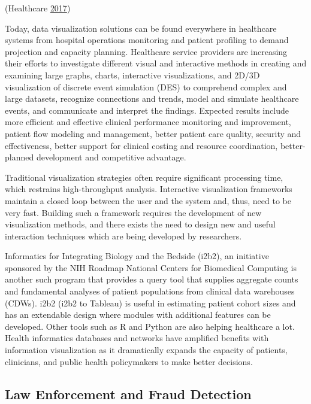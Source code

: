 \documentclass[]{book}
\theoremstyle{definition}
\theoremstyle{definition}
\theoremstyle{definition}
\theoremstyle{remark}
\begin{document}
(Healthcare \protect\hyperlink{ref-marksman}{2017})

Today, data visualization solutions can be found everywhere in
healthcare systems from hospital operations monitoring and patient
profiling to demand projection and capacity planning. Healthcare service
providers are increasing their efforts to investigate different visual
and interactive methods in creating and examining large graphs, charts,
interactive visualizations, and 2D/3D visualization of discrete event
simulation (DES) to comprehend complex and large datasets, recognize
connections and trends, model and simulate healthcare events, and
communicate and interpret the findings. Expected results include more
efficient and effective clinical performance monitoring and improvement,
patient flow modeling and management, better patient care quality,
security and effectiveness, better support for clinical costing and
resource coordination, better-planned development and competitive
advantage.

Traditional visualization strategies often require significant
processing time, which restrains high-throughput analysis. Interactive
visualization frameworks maintain a closed loop between the user and the
system and, thus, need to be very fast. Building such a framework
requires the development of new visualization methods, and there exists
the need to design new and useful interaction techniques which are being
developed by researchers.

Informatics for Integrating Biology and the Bedside (i2b2), an
initiative sponsored by the NIH Roadmap National Centers for Biomedical
Computing is another such program that provides a query tool that
supplies aggregate counts and fundamental analyses of patient
populations from clinical data warehouses (CDWs). i2b2 (i2b2 to Tableau)
is useful in estimating patient cohort sizes and has an extendable
design where modules with additional features can be developed. Other
tools such as R and Python are also helping healthcare a lot. Health
informatics databases and networks have amplified benefits with
information visualization as it dramatically expands the capacity of
patients, clinicians, and public health policymakers to make better
decisions.

\subsection{Law Enforcement and Fraud
Detection}\label{law-enforcement-and-fraud-detection}
\end{document}
